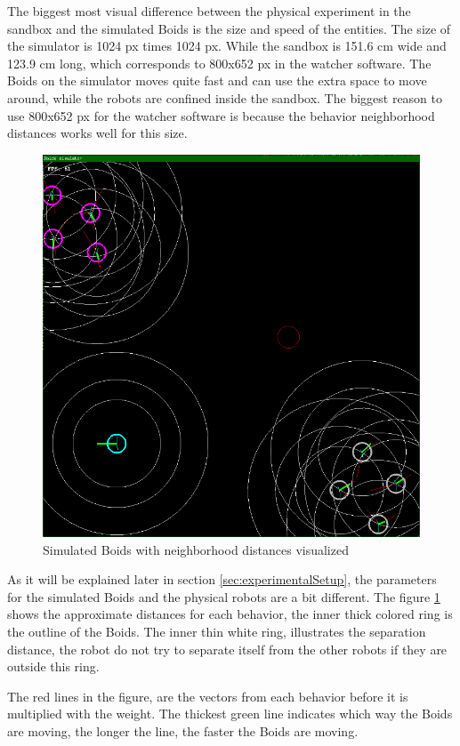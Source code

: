 The biggest most visual difference between the physical experiment in the sandbox and the simulated Boids is the size and speed of the entities. The size of the simulator is 1024 px times 1024 px. While the sandbox is 151.6 cm wide and 123.9 cm long, which corresponds to 800x652 px in the watcher software. The Boids on the simulator moves quite fast and can use the extra space to move around, while the robots are confined inside the sandbox. The biggest reason to use 800x652 px for the watcher software is because the behavior neighborhood distances works well for this size.

\begin{figure}[h]
\begin{center}
\includegraphics[width=0.8\linewidth]{figs/simulator}
\end{center}
\caption[Simulator distances]{Simulated Boids with neighborhood distances visualized}
\label{fig:simulatordistances}
\end{figure}



As it will be explained later in section \ref{sec:experimentalSetup}, the parameters for the simulated Boids and the physical robots are a bit different.
The figure \ref{fig:simulatordistances} shows the approximate distances for each behavior, the inner thick colored ring is the outline of the Boids. The inner thin white ring, illustrates the separation distance, the robot do not try to separate itself from the other robots if they are outside this ring.

The red lines in the figure, are the vectors from each behavior before it is multiplied with the weight. The thickest green line indicates which way the Boids are moving, the longer the line, the faster the Boids are moving.

